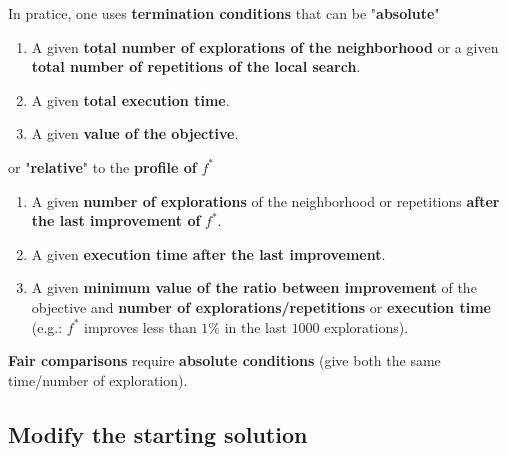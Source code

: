 In pratice, one uses \textbf{termination conditions} that can be "\textbf{absolute}"
\begin{enumerate}
	\item A given \textbf{total number of explorations of the neighborhood} or a given \textbf{total number of repetitions of the local search}.\\
	
	\item A given \textbf{total execution time}.\\
	
	\item A given \textbf{value of the objective}.\\
\end{enumerate}

or "\textbf{relative}" to the \textbf{profile of} $f^\ast$
\begin{enumerate}
	\item A given \textbf{number of explorations} of the neighborhood or repetitions \textbf{after the last improvement of} $f^\ast$.\\
	
	\item A given \textbf{execution time after the last improvement}.\\
	
	\item A given \textbf{minimum value of the ratio between improvement} of the objective and \textbf{number of explorations/repetitions} or \textbf{execution time} (e.g.: $f^\ast$ improves less than $1\%$ in the last $1000$ explorations).\\
\end{enumerate}

\textbf{Fair comparisons} require \textbf{absolute conditions} (give both the same time/number of exploration).\\

\newpage

\subsection{Modify the starting solution}

